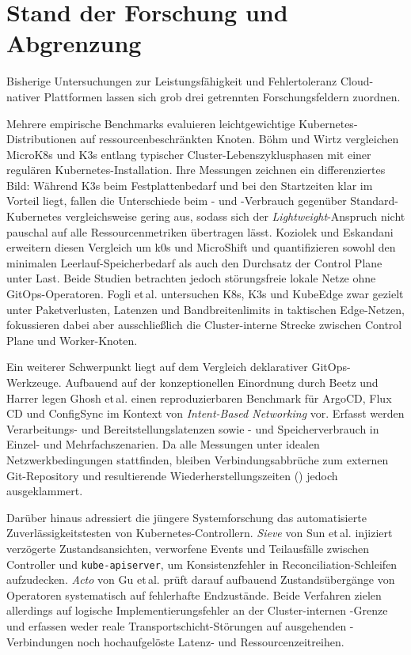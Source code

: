 \section{Stand der Forschung und Abgrenzung}
\label{sec:stand-der-forschung}

Bisherige Untersuchungen zur Leistungsfähigkeit und Fehlertoleranz Cloud-nativer Plattformen lassen sich grob drei getrennten Forschungsfeldern zuordnen.

Mehrere empirische Benchmarks evaluieren leichtgewichtige Kubernetes-Distributionen auf ressourcenbeschränkten Knoten. Böhm und Wirtz vergleichen MicroK8s und K3s entlang typischer Cluster-Lebenszyklusphasen mit einer regulären Kubernetes-Installation.\autocite{boehm_k3s_2021} Ihre Messungen zeichnen ein differenziertes Bild: Während K3s beim Festplattenbedarf und bei den Startzeiten klar im Vorteil liegt, fallen die Unterschiede beim - und -Verbrauch gegenüber Standard-Kubernetes vergleichsweise gering aus, sodass sich der \textit{Lightweight}-Anspruch nicht pauschal auf alle Ressourcenmetriken übertragen lässt. Koziolek und Eskandani erweitern diesen Vergleich um k0s und MicroShift und quantifizieren sowohl den minimalen Leerlauf-Speicherbedarf als auch den Durchsatz der Control Plane unter Last.\autocite{koziolek_k3s_2023} Beide Studien betrachten jedoch störungsfreie lokale Netze ohne GitOps-Operatoren. Fogli et\,al. untersuchen K8s, K3s und KubeEdge zwar gezielt unter Paketverlusten, Latenzen und Bandbreitenlimits in taktischen Edge-Netzen, fokussieren dabei aber ausschließlich die Cluster-interne Strecke zwischen Control Plane und Worker-Knoten.\autocite{fogli_k3s_2021}

Ein weiterer Schwerpunkt liegt auf dem Vergleich deklarativer GitOps-Werkzeuge. Aufbauend auf der konzeptionellen Einordnung durch Beetz und Harrer legen Ghosh et\,al. einen reproduzierbaren Benchmark für ArgoCD, Flux\,CD und ConfigSync im Kontext von \textit{Intent-Based Networking} vor.\autocite{ghosh_gitops_2025} Erfasst werden Verarbeitungs- und Bereitstellungslatenzen sowie - und Speicherverbrauch in Einzel- und Mehrfachszenarien. Da alle Messungen unter idealen Netzwerkbedingungen stattfinden, bleiben Verbindungsabbrüche zum externen Git-Repository und resultierende Wiederherstellungszeiten () jedoch ausgeklammert.

Darüber hinaus adressiert die jüngere Systemforschung das automatisierte Zuverlässigkeitstesten von Kubernetes-Controllern. \textit{Sieve} von Sun et\,al. injiziert verzögerte Zustandsansichten, verworfene Events und Teilausfälle zwischen Controller und \texttt{kube-apiserver}, um Konsistenzfehler in Reconciliation-Schleifen aufzudecken.\autocite{sun_sieve_2022} \textit{Acto} von Gu et\,al. prüft darauf aufbauend Zustandsübergänge von Operatoren systematisch auf fehlerhafte Endzustände.\autocite{gu_acto_2023} Beide Verfahren zielen allerdings auf logische Implementierungsfehler an der Cluster-internen -Grenze und erfassen weder reale Transportschicht-Störungen auf ausgehenden -Verbindungen noch hochaufgelöste Latenz- und Ressourcenzeitreihen.

